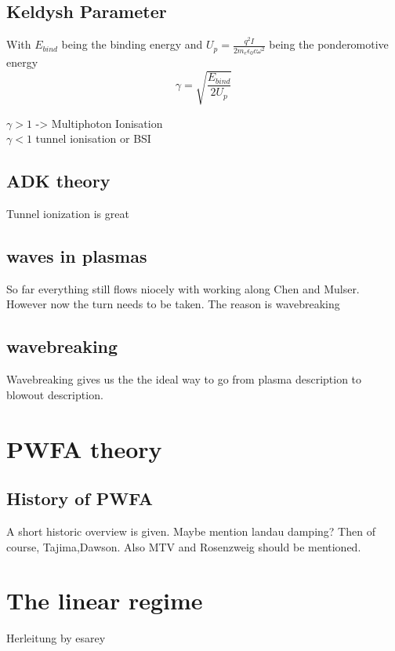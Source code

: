 \subsection{Keldysh Parameter}

With $E_{bind}$ being the binding energy and $U_p=\frac{q^2 I}{2 m_e \epsilon_0 c \omega^2}$ being the ponderomotive energy 
\begin{equation}
\gamma=\sqrt{\frac{E_{bind}}{2U_p}}
\end{equation}

$\gamma >1 $ -> Multiphoton Ionisation\\
$\gamma < 1$ tunnel ionisation or BSI

\subsection{ADK theory}
Tunnel ionization is great
	


\subsection{waves in plasmas}
So far everything still flows niocely with working along Chen and Mulser. However now the turn needs to be taken.
The reason is wavebreaking
\subsection{wavebreaking}
Wavebreaking gives us the the ideal way to go from plasma description to blowout description.
\section{PWFA theory}
\subsection{History of PWFA}
A short historic overview is given. 
Maybe mention landau damping? Then of course, Tajima,Dawson. Also MTV and Rosenzweig should be mentioned.
\section{The linear regime}
Herleitung by esarey \cite{RevModPhys.81.1229}


